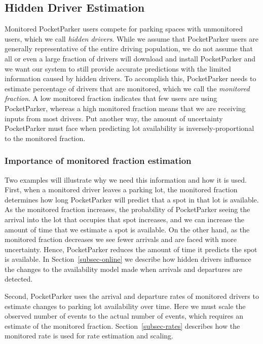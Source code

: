 \subsection{Hidden Driver Estimation}
\label{subsec-hidden}

Monitored PocketParker users compete for parking spaces with unmonitored
users, which we call \textit{hidden drivers}. While we assume that
PocketParker users are generally representative of the entire driving
population, we do not assume that all or even a large fraction of drivers
will download and install PocketParker and we want our system to still
provide accurate predictions with the limited information caused by hidden
drivers. To accomplish this, PocketParker needs to estimate percentage of
drivers that are monitored, which we call the \textit{monitored fraction}.
 A low monitored fraction indicates that
few users are using PocketParker, whereas a high monitored fraction means
that we are receiving inputs from most drivers. Put another way, the amount
of uncertainty PocketParker must face when predicting lot availability is
inversely-proportional to the monitored fraction.

\subsubsection{Importance of monitored fraction estimation}

Two examples will illustrate why we need this information and how it is used.
First, when a monitored driver leaves a parking lot, the monitored fraction
determines how long PocketParker will predict that a spot in that lot is
available. As the monitored fraction increases, the probability of
PocketParker seeing the arrival into the lot that occupies that spot
increases, and we can increase the amount of time that we estimate a spot is
available. On the other hand, as the monitored fraction decreases we see
fewer arrivals and are faced with more uncertainty. Hence, PocketParker
reduces the amount of time it predicts the spot is available. In
Section~\ref{subsec-online} we describe how hidden drivers influence the
changes to the availability model made when arrivals and departures are
detected.

Second, PocketParker uses the arrival and departure rates of monitored
drivers to estimate changes to parking lot availability over time. Here we
must scale the observed number of events to the actual number of events,
which requires an estimate of the monitored fraction.
Section~\ref{subsec-rates} describes how the monitored rate is used for rate
estimation and scaling.

